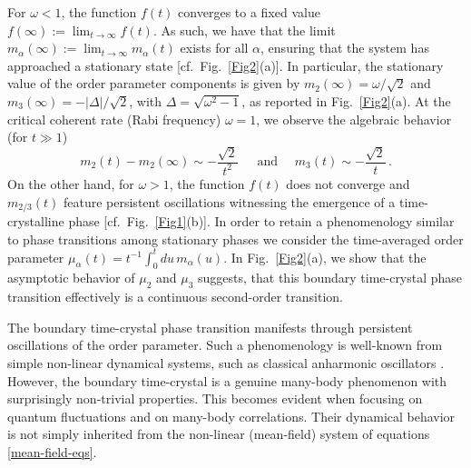 \documentclass[prl,superscriptaddress,showpacs,longbibliography,reprint]{revtex4-2}
\begin{document}
For $\omega<1$, the function $f(t)$ converges to a fixed value $f(\infty):=\lim_{t\to\infty}f(t)$. As such, we have that the limit $m_\alpha(\infty):=\lim_{t\to\infty}m_{\alpha}(t)$ exists for all $\alpha$, ensuring that the system has approached a stationary state [cf.~Fig.~\ref{Fig2}(a)]. In particular, the stationary value of the order parameter components is given by $m_2(\infty)=\omega/\sqrt{2}$ and $m_3(\infty)=-|\Delta|/\sqrt{2}$, with $\Delta=\sqrt{\omega^2-1}$, as reported in Fig.~\ref{Fig2}(a). At the critical coherent rate (Rabi frequency) $\omega=1$, we observe the algebraic behavior (for $t\gg 1$)
\begin{equation}
m_2(t)-m_2(\infty) \sim -\frac{\sqrt{2}}{ t^2}\, \quad \mbox{ and } \quad m_3(t)\sim-\frac{\sqrt{2}}{ t} \, .
    \label{mf-crit}
\end{equation}
On the other hand, for $\omega>1$, the function $f(t)$ does not converge and $m_{2/3}(t)$ feature persistent oscillations witnessing the emergence of a time-crystalline phase [cf.~Fig.~\ref{Fig1}(b)]. In order to retain a phenomenology similar to phase transitions among stationary phases we consider the time-averaged order parameter  $\mu_{\alpha}(t)=t^{-1}\int_0^t du \, m_\alpha(u)$. 
In Fig.~\ref{Fig2}(a), we show that the asymptotic behavior of $\mu_2$ and $\mu_3$ suggests, that this boundary time-crystal phase transition effectively is a continuous second-order transition. 
\vspace{10pt}

 The boundary time-crystal phase transition manifests through persistent oscillations of the order parameter. Such a phenomenology is well-known from simple non-linear dynamical systems, such as classical anharmonic oscillators \cite{vanderpol1926}. However, the boundary time-crystal is a genuine many-body phenomenon with surprisingly non-trivial properties. This becomes evident when focusing on quantum fluctuations and on many-body correlations. Their dynamical behavior is not simply inherited from the non-linear (mean-field) system of equations \eqref{mean-field-eqs}.
\end{document}
